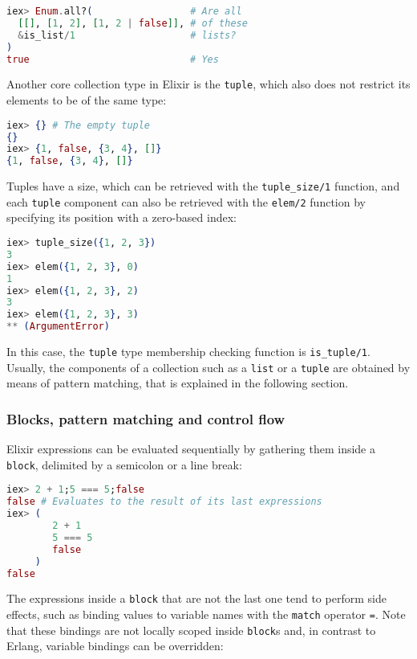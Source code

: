 \begin{lstlisting}[language=elixir,numbers=none,frame=none]
iex> Enum.all?(                 # Are all
  [[], [1, 2], [1, 2 | false]], # of these
  &is_list/1                    # lists?
)
true                            # Yes
\end{lstlisting}

Another core collection type in Elixir is the \verb|tuple|, which also does not
restrict its elements to be of the same type:

\begin{lstlisting}[language=elixir,numbers=none,frame=none]
iex> {} # The empty tuple
{}
iex> {1, false, {3, 4}, []}
{1, false, {3, 4}, []}
\end{lstlisting}

Tuples have a size, which can be retrieved with the \verb|tuple_size/1|
function, and each \verb|tuple| component can also be retrieved with the
\verb|elem/2| function by specifying its position with a zero-based index:

\begin{lstlisting}[language=elixir,numbers=none,frame=none]
iex> tuple_size({1, 2, 3})
3
iex> elem({1, 2, 3}, 0)
1
iex> elem({1, 2, 3}, 2)
3
iex> elem({1, 2, 3}, 3)
** (ArgumentError)
\end{lstlisting}

In this case, the \verb|tuple| type membership checking function is
\verb|is_tuple/1|. Usually, the components of a collection such as a \verb|list|
or a \verb|tuple| are obtained by means of pattern matching, that is explained
in the following section.

\subsubsection{Blocks, pattern matching and control flow}

Elixir expressions can be evaluated sequentially by gathering them inside a
\verb|block|, delimited by a semicolon or a line break:

\begin{lstlisting}[language=elixir,numbers=none,frame=none]
iex> 2 + 1;5 === 5;false
false # Evaluates to the result of its last expressions
iex> (
        2 + 1
        5 === 5
        false
     )
false
\end{lstlisting}

The expressions inside a \verb|block| that are not the last one tend to perform
side effects, such as binding values to variable names with the \verb|match|
operator \verb|=|. Note that these bindings are not locally scoped inside
\verb|block|s and, in contrast to Erlang, variable bindings can be overridden:


